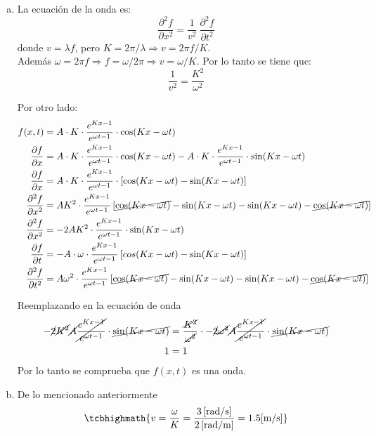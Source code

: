 \begin{enumerate}[a)]
	
	\item La ecuación de la onda es: \[ \frac{\partial^2f}{\partial x^2} = \frac{1}{v^2} \ \frac{\partial^2f}{\partial t^2} \] donde \( v = \lambda f \), pero \( K = 2\pi / \lambda  \Rightarrow v = 2\pi f / K \). \\
	Además \( \omega = 2\pi f  \Rightarrow f = \omega / 2\pi \Rightarrow v = \omega / K \). Por lo tanto se tiene que:
	\[ \frac{1}{v^2} = \frac{K^2}{\omega^2} \]
	
	Por otro lado:
	\begin{align*}
		f(x,t) &= A \cdot K \cdot \frac{e^{Kx-1}}{e^{\omega t-1}} \cdot \cos(Kx-\omega t)\\
		\frac{\partial f}{\partial x} &= A \cdot K \cdot \frac{e^{Kx-1}}{e^{\omega t-1}} \cdot \cos(Kx-\omega t) - A \cdot K \cdot \frac{e^{Kx-1}}{e^{\omega t-1}} \cdot \sin(Kx - \omega t) \\
		\frac{\partial f}{\partial x} &= A \cdot K \cdot \frac{e^{Kx-1}}{e^{\omega t-1}} \cdot [\cos(Kx-\omega t) - \sin(Kx-\omega t)] \\
		\frac{\partial^2 f}{\partial x^2} &= A K^2 \cdot \frac{e^{Kx-1}}{e^{\omega t-1}}\left[ \cancel{\cos (Kx-\omega t)} - \sin (Kx-\omega t) - \sin (Kx-\omega t) - \cancel{\cos (Kx-\omega t)} \right]\\
		\frac{\partial^2 f}{\partial x^2} &= -2A K^2 \cdot \frac{e^{Kx-1}}{e^{\omega t-1}} \cdot \sin (Kx-\omega t)\\
		\frac{\partial f}{\partial t} &= -A \cdot \omega \cdot \frac{e^{Kx-1}}{e^{\omega t-1}} \left[ cos(Kx-\omega t) - \sin(Kx-\omega t) \right]\\
		\frac{\partial^2 f}{\partial t^2} &= A \omega^2 \cdot \frac{e^{Kx-1}}{e^{\omega t-1}}\left[ \cancel{\cos (Kx-\omega t)} - \sin (Kx-\omega t) - \sin (Kx-\omega t) - \cancel{\cos (Kx-\omega t)} \right]
	\end{align*}	
	
	Reemplazando en la ecuación de onda
	\begin{align*}
	-\cancel{2}\cancel{K^2}\cancel{A}\cancel{\frac{e^{Kx-1}}{e^{\omega t-1}}}\cdot\cancel{\sin(Kx- \omega t)} &= \frac{\cancel{K^2}}{\cancel{\omega^2}} \cdot -\cancel{2}\cancel{\omega^2}\cancel{A}\cancel{\frac{e^{Kx-1}}{e^{\omega t-1}}} \cdot\cancel{\sin(Kx- \omega t)} \\
	1 &= 1
	\end{align*}
	Por lo tanto se comprueba que \( f(x,t) \) es una onda.
	\item De lo mencionado anteriormente
	\begin{equation*}
		\tcbhighmath{v = \frac{\omega}{K} = \frac{3\left[ \text{rad/s} \right]}{2\left[ \text{rad/m} \right]} = 1.5[\text{m/s}]}
	\end{equation*}
\end{enumerate}

